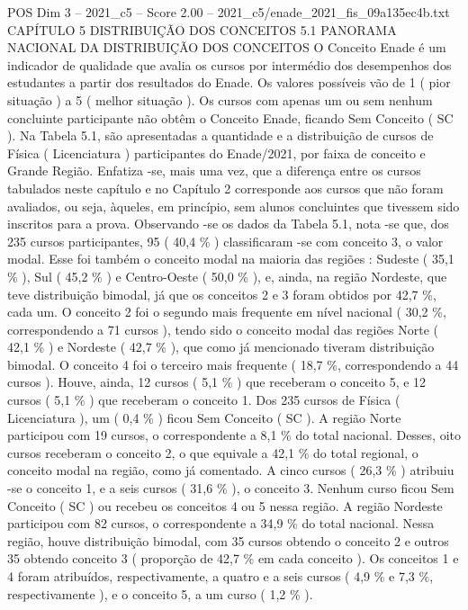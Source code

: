 \begin{textsample}{POS Dim 3 – 2021\_c5 – Score 2.00 – 2021\_c5/enade\_2021\_fis\_09a135ec4b.txt}  \label{ex:f3_pos_081}
CAPÍTULO 5 DISTRIBUIÇÃO DOS CONCEITOS 5.1 PANORAMA NACIONAL DA DISTRIBUIÇÃO DOS CONCEITOS O Conceito Enade é um indicador de qualidade que avalia os cursos por intermédio dos desempenhos dos estudantes a partir dos resultados do Enade.
Os valores possíveis vão de 1 ( pior situação ) a 5 ( melhor situação ).
Os cursos com apenas um ou sem nenhum concluinte participante não obtêm o Conceito Enade, ficando Sem Conceito ( SC ).
Na Tabela 5.1, são apresentadas a quantidade e a distribuição de cursos de Física ( Licenciatura ) participantes do Enade/2021, por faixa de conceito e Grande Região.
Enfatiza -se, mais uma vez, que a diferença entre os cursos tabulados neste capítulo e no Capítulo 2 corresponde aos cursos que não foram avaliados, ou seja, àqueles, em princípio, sem alunos concluintes que tivessem sido inscritos para a prova.
Observando -se os dados da Tabela 5.1, nota -se que, dos 235 cursos participantes, 95 ( 40,4 \% ) classificaram -se com conceito 3, o valor modal.
Esse foi também o conceito modal na maioria das regiões : Sudeste ( 35,1 \% ), Sul ( 45,2 \% ) e Centro-Oeste ( 50,0 \% ), e, ainda, na região Nordeste, que teve distribuição bimodal, já que os conceitos 2 e 3 foram obtidos por 42,7 \%, cada um.
O conceito 2 foi o segundo mais frequente em nível nacional ( 30,2 \%, correspondendo a 71 cursos ), tendo sido o conceito modal das regiões Norte ( 42,1 \% ) e Nordeste ( 42,7 \% ), que como já mencionado tiveram distribuição bimodal.
O conceito 4 foi o terceiro mais frequente ( 18,7 \%, correspondendo a 44 cursos ).
Houve, ainda, 12 cursos ( 5,1 \% ) que receberam o conceito 5, e 12 cursos ( 5,1 \% ) que receberam o conceito 1.
Dos 235 cursos de Física ( Licenciatura ), um ( 0,4 \% ) ficou Sem Conceito ( SC ).
A região Norte participou com 19 cursos, o correspondente a 8,1 \% do total nacional.
Desses, oito cursos receberam o conceito 2, o que equivale a 42,1 \% do total regional, o conceito modal na região, como já comentado.
A cinco cursos ( 26,3 \% ) atribuiu -se o conceito 1, e a seis cursos ( 31,6 \% ), o conceito 3.
Nenhum curso ficou Sem Conceito ( SC ) ou recebeu os conceitos 4 ou 5 nessa região.
A região Nordeste participou com 82 cursos, o correspondente a 34,9 \% do total nacional.
Nessa região, houve distribuição bimodal, com 35 cursos obtendo o conceito 2 e outros 35 obtendo conceito 3 ( proporção de 42,7 \% em cada conceito ).
Os conceitos 1 e 4 foram atribuídos, respectivamente, a quatro e a seis cursos ( 4,9 \% e 7,3 \%, respectivamente ), e o conceito 5, a um curso ( 1,2 \% ).

\end{textsample}
